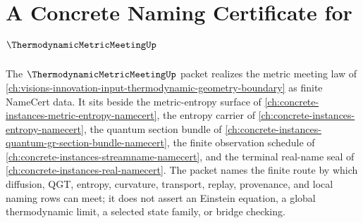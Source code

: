 \chapter{A Concrete Naming Certificate for $\ThermodynamicMetricMeetingUp$}
\label{ch:concrete-instances-thermodynamic-metric-meeting-namecert}

The $\ThermodynamicMetricMeetingUp$ packet realizes the metric meeting law of \autoref{ch:visions-innovation-input-thermodynamic-geometry-boundary} as finite NameCert data. It sits beside the metric-entropy surface of \autoref{ch:concrete-instances-metric-entropy-namecert}, the entropy carrier of \autoref{ch:concrete-instances-entropy-namecert}, the quantum section bundle of \autoref{ch:concrete-instances-quantum-gr-section-bundle-namecert}, the finite observation schedule of \autoref{ch:concrete-instances-streamname-namecert}, and the terminal real-name seal of \autoref{ch:concrete-instances-real-namecert}. The packet names the finite route by which diffusion, QGT, entropy, curvature, transport, replay, provenance, and local naming rows can meet; it does not assert an Einstein equation, a global thermodynamic limit, a selected state family, or bridge checking.

